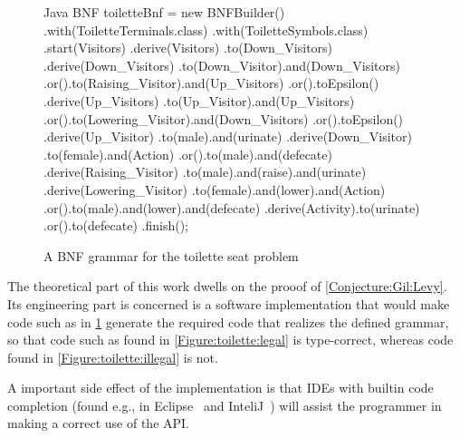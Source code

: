 \begin{figure}[htbp]
  \scriptsize
  \begin{lcode}{Java}
BNF toiletteBnf = new BNFBuilder()
  .with(ToiletteTerminals.class)
  .with(ToiletteSymbols.class)
  .start(Visitors)
  .derive(Visitors)
    .to(Down_Visitors)
  .derive(Down_Visitors)
    .to(Down_Visitor).and(Down_Visitors)
    .or().to(Raising_Visitor).and(Up_Visitors)
    .or().toEpsilon()
  .derive(Up_Visitors)
    .to(Up_Visitor).and(Up_Visitors)
    .or().to(Lowering_Visitor).and(Down_Visitors)
    .or().toEpsilon()
  .derive(Up_Visitor)
    .to(male).and(urinate)
  .derive(Down_Visitor)
    .to(female).and(Action)
    .or().to(male).and(defecate)
  .derive(Raising_Visitor)
      .to(male).and(raise).and(urinate)
  .derive(Lowering_Visitor)
    .to(female).and(lower).and(Action)
    .or().to(male).and(lower).and(defecate)
  .derive(Activity).to(urinate)
    .or().to(defecate)
  .finish();
  \end{lcode}
  \caption{A BNF grammar for the toilette seat problem}
  \label{Figure:fluent}
\end{figure}
The theoretical part of this work dwells on the prooof of 
  \cref{Conjecture:Gil:Levy}.
Its engineering part is concerned is  
  a software implementation that would make code 
  such as in \cref{Figure:fluent} generate
  the required \Java code that realizes the 
  defined grammar, so that code such as 
  found in \cref{Figure:toilette:legal} is type-correct,
  whereas code found in \cref{Figure:toilette:illegal} is not.

A important side effect of the implementation is that IDEs with builtin code completion 
 (found e.g., in Eclipse~\cite{Elcipse} and InteliJ~\cite{InteliJ}) 
 will assist the programmer in making a correct use of the API.
